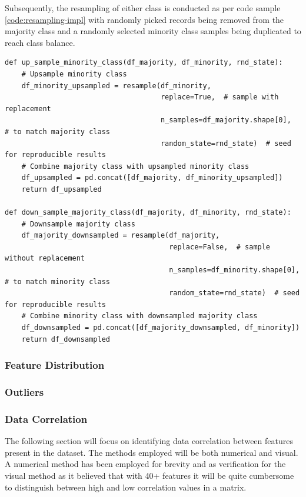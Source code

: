 Subsequently, the resampling of either class is conducted as per code sample \ref{code:resampling-impl} with randomly picked records being removed from the majority class and a randomly selected minority class samples being duplicated to reach class balance. 
\begin{landscape}
\begin{code}
\label{code:resampling-impl}
\begin{verbatim}
def up_sample_minority_class(df_majority, df_minority, rnd_state):
    # Upsample minority class
    df_minority_upsampled = resample(df_minority,
                                     replace=True,  # sample with replacement
                                     n_samples=df_majority.shape[0],  # to match majority class
                                     random_state=rnd_state)  # seed for reproducible results
    # Combine majority class with upsampled minority class
    df_upsampled = pd.concat([df_majority, df_minority_upsampled])
    return df_upsampled

def down_sample_majority_class(df_majority, df_minority, rnd_state):
    # Downsample majority class
    df_majority_downsampled = resample(df_majority,
                                       replace=False,  # sample without replacement
                                       n_samples=df_minority.shape[0],  # to match minority class
                                       random_state=rnd_state)  # seed for reproducible results
    # Combine minority class with downsampled majority class
    df_downsampled = pd.concat([df_majority_downsampled, df_minority])
    return df_downsampled
\end{verbatim}
\end{code}
\end{landscape}

\subsubsection{Feature Distribution}\label{sec:impl-data-analysis:feature-dist}

\subsubsection{Outliers}\label{sec:impl-data-analysis:outliers}

\subsubsection{Data Correlation}\label{sec:impl-data-analysis:corr:generic-approach}
The following section will focus on identifying data correlation between features present in the dataset. The methods employed will be both numerical and visual. A numerical method has been employed for brevity and as verification for the visual method as it believed that with 40+ features it will be quite cumbersome to distinguish between high and low correlation values in a matrix.


